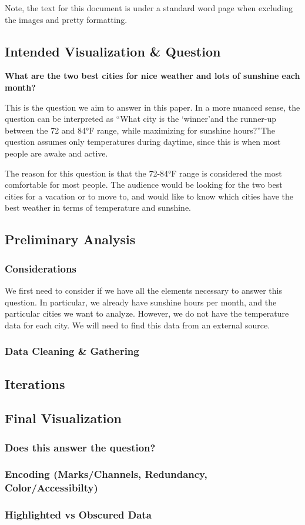 \documentclass{article}
\begin{document}
\newpage
Note, the text for this document is under a standard word page when excluding the images and pretty formatting. 

\subsection{Intended Visualization \& Question}

\textbf{What are the two best cities for nice weather and lots of sunshine each month?}

This is the question we aim to answer in this paper. In a more nuanced sense,
the question can be interpreted as \textquotedblleft What city is the \textquoteleft winner\textquoteright and the runner-up between the 72 and 84°F
range, while maximizing for sunshine hours?\textquotedblright The question assumes only temperatures during daytime, since this 
is when most people are awake and active.

The reason for this question is that the 72-84°F range is considered the most comfortable for most people. 
The audience would be looking for the two best cities for a vacation or to move to, and would like to know which cities have the best weather in terms of temperature and sunshine.


\subsection{Preliminary Analysis}

\subsubsection{Considerations}

We first need to consider if we have all the elements necessary to answer this question.
In particular, we already have sunshine hours per month, and the particular cities we want to analyze.
However, we do not have the temperature data for each city. We will need to find this data from an external source.

\subsubsection{Data Cleaning \& Gathering}

\subsection{Iterations}

\subsection{Final Visualization}
\subsubsection{Does this answer the question?}
\subsubsection{Encoding (Marks/Channels, Redundancy, Color/Accessibilty)}
\subsubsection{Highlighted vs Obscured Data}



\end{document}
